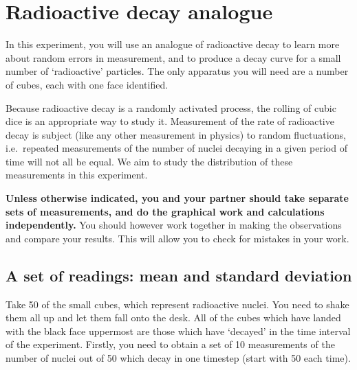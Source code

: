 \section{Radioactive decay analogue}
\label{decay}


In this experiment, you will use an analogue of radioactive decay to learn more about random errors in measurement, and to produce a decay curve for a small number of `radioactive' particles.  The only apparatus you will need are a number of cubes, each with one face identified.

\begin{center}
\end{center}

Because radioactive decay is a randomly activated process, the rolling of cubic dice is an appropriate way to study it.  Measurement of the rate of radioactive decay is subject (like any other measurement in physics) to random fluctuations, i.e.\ repeated measurements of the number of nuclei decaying in a given period of time will not all be equal.  We aim to study the distribution of these measurements in this experiment.

{\bf Unless otherwise indicated, you and your partner should take separate sets of measurements, and do the graphical work and calculations independently.}  You should however work together in making the observations and compare your results.  This will allow you to check for mistakes in your work.

\subsection{A set of readings: mean and standard deviation}

Take 50 of the small cubes, which represent radioactive nuclei.  You need to shake them all up and let them fall onto the desk.  All of the cubes which have landed with the black face uppermost are those which have `decayed' in the time interval of the experiment.  Firstly, you need to obtain a set of 10 measurements of the number of nuclei out of 50 which decay in one timestep (start with 50 each time).\\

